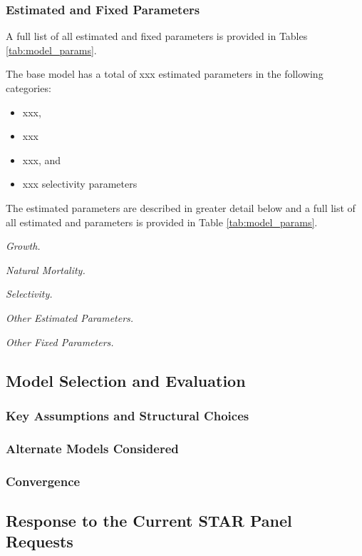 \documentclass[12pt,]{article}
\begin{document}
\subsubsection{Estimated and Fixed
Parameters}\label{estimated-and-fixed-parameters}

A full list of all estimated and fixed parameters is provided in Tables
\ref{tab:model_params}.

The base model has a total of xxx estimated parameters in the following
categories:

\begin{itemize}
  \item xxx,
  \item xxx
  \item xxx, and
  \item xxx selectivity parameters
\end{itemize}

The estimated parameters are described in greater detail below and a
full list of all estimated and parameters is provided in Table
\ref{tab:model_params}.

\emph{Growth.}

\emph{Natural Mortality.}

\emph{Selectivity.}

\emph{Other Estimated Parameters.}

\emph{Other Fixed Parameters.}

\subsection{Model Selection and
Evaluation}\label{model-selection-and-evaluation}

\subsubsection{Key Assumptions and Structural
Choices}\label{key-assumptions-and-structural-choices}

\subsubsection{Alternate Models
Considered}\label{alternate-models-considered}

\subsubsection{Convergence}\label{convergence}

\subsection{Response to the Current STAR Panel
Requests}\label{response-to-the-current-star-panel-requests}
\end{document}
